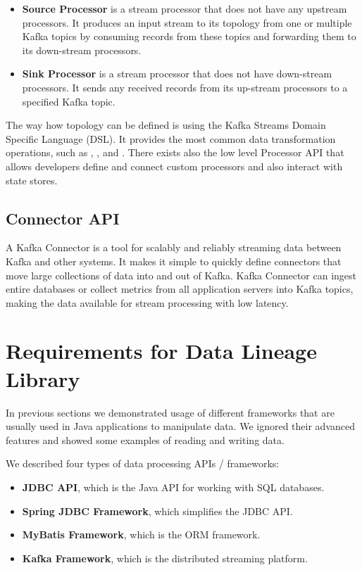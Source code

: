 \begin{itemize}
  \item \textbf{Source Processor} is a stream processor
    that does not have any upstream processors. It produces an input stream
    to its topology from one or multiple Kafka topics by consuming records
    from these topics and forwarding them to its down-stream processors.
  \item \textbf{Sink Processor} is a stream processor
    that does not have down-stream processors. It sends any received records
    from its up-stream processors to a specified Kafka topic.
\end{itemize}

The way how topology can be defined is using the Kafka Streams Domain Specific Language (DSL).
It provides the most common data transformation operations, such as
, ,  and .
There exists also the low level Processor API that allows developers define
and connect custom processors and also interact with state stores.




\subsection{Connector API \label{frameworks:kafka:connector}}

A Kafka Connector is a tool for scalably and reliably streaming data between Kafka
and other systems. It makes it simple to quickly define connectors that move
large collections of data into and out of Kafka.
Kafka Connector can ingest entire databases or collect metrics from all
application servers into Kafka topics, making the data available
for stream processing with low latency.




\section{Requirements for Data Lineage Library \label{frameworks:requirements}}

In previous sections we demonstrated usage of different frameworks
that are usually used in Java applications to manipulate data.
We ignored their advanced features and showed some examples of reading
and writing data.

We described four types of data processing APIs / frameworks:
\begin{itemize}
  \item \textbf{JDBC API}, which is the Java API for working with SQL databases.
  \item \textbf{Spring JDBC Framework}, which simplifies the JDBC API.
  \item \textbf{MyBatis Framework}, which is the ORM framework.
  \item \textbf{Kafka Framework}, which is the distributed streaming platform.
\end{itemize}

